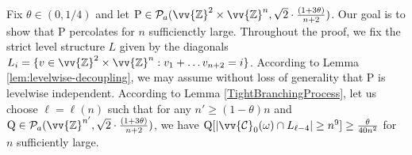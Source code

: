 \documentclass[11pt]{article}
\renewcommand{\P}{\mathrm{P}}
\newcommand{\Z}{\mathbb{Z}}
\DeclarePairedDelimiter{\abs}{\lvert}{\rvert}
\theoremstyle{remark}
\begin{document}
 Fix $\theta \in (0,1/4)$ and let $\P \in \mathcal{P}_a(\vv{\Z}^{2} \times \vv{\Z}^{n}, \sqrt{2} \cdot \frac{(1 + 3\theta)}{n + 2})$.  Our goal is to show that $\P$ percolates for $n$ sufficienctly large. Throughout the proof, we fix the strict level structure $L$ given by the diagonals $L_{i} = \{v \in \vv{\Z}^{2} \times \vv{\Z}^{n}: v_1 + \ldots v_{n+2} = i\}$. According to Lemma \ref{lem:levelwise-decoupling}, we may assume without loss of generality that $\P$ is levelwise independent.
 According to Lemma \ref{TightBranchingProcess}, let us choose $\ell = \ell(n)$  such that for any $n' \ge (1-\theta)n$ and $\mathrm Q \in \mathcal{P}_a(\vv{\Z}^{n'},\sqrt{2} \cdot \frac{(1 + 3\theta)}{n + 2})$, we have $\mathrm Q[\abs{\vv{\mathcal{C}}_0(\omega) \cap L_{\ell - 4}} \geq n^{9}] \geq \frac{\theta}{40 n^2}$ for $n$ sufficiently large.
 
\end{document}
